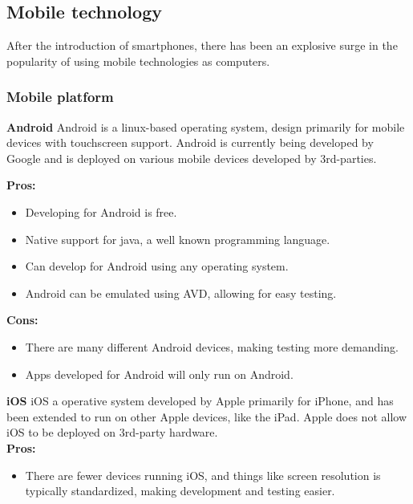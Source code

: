 
\subsection{Mobile technology}

After the introduction of smartphones, there has been an explosive surge in the popularity of using mobile technologies as computers.

\newpage
\subsubsection{Mobile platform}
{\bf Android}
Android is a linux-based operating system, design primarily for mobile devices with touchscreen support. Android is currently being developed by Google and is deployed on various mobile devices developed by 3rd-parties. \linebreak

\indent
  {\bf Pros:}
  \begin{itemize}
    \item Developing for Android is free.
    \item Native support for java, a well known programming language.
    \item Can develop for Android using any operating system.
    \item Android can be emulated using AVD, allowing for easy testing.
  \end{itemize}

\indent
  {\bf Cons:}
  \begin{itemize}
    \item There are many different Android devices, making testing more demanding.
    \item Apps developed for Android will only run on Android.
  \end{itemize}

\noindent
{\bf iOS}
iOS a operative system developed by Apple primarily for iPhone, and has been extended 
to run on other Apple devices, like the iPad. Apple does not allow iOS to be deployed 
on 3rd-party hardware. \\

\indent
  {\bf Pros:}
  \begin{itemize}
    \item There are fewer devices running iOS, and things like screen resolution is 
    typically standardized, making development and testing easier.
  \end{itemize}

